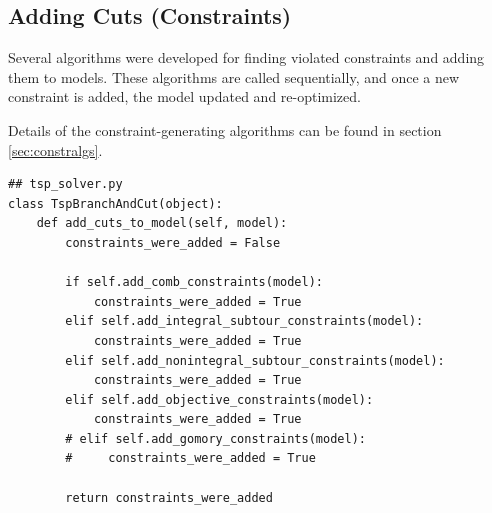 \documentclass{article}
\begin{document}
\subsection{Adding Cuts (Constraints)}
\begin{flushleft}

Several algorithms were developed
for finding violated constraints
and adding them to models.
These algorithms are called sequentially,
and once a new constraint is added,
the model updated and re-optimized.

Details of the constraint-generating algorithms
can be found in section \ref{sec:constralgs}.

\begin{lstlisting}
## tsp_solver.py
class TspBranchAndCut(object):
    def add_cuts_to_model(self, model):
        constraints_were_added = False

        if self.add_comb_constraints(model):
            constraints_were_added = True
        elif self.add_integral_subtour_constraints(model):
            constraints_were_added = True
        elif self.add_nonintegral_subtour_constraints(model):
            constraints_were_added = True
        elif self.add_objective_constraints(model):
            constraints_were_added = True
        # elif self.add_gomory_constraints(model):
        #     constraints_were_added = True

        return constraints_were_added
\end{lstlisting}

\end{flushleft}
\end{document}
